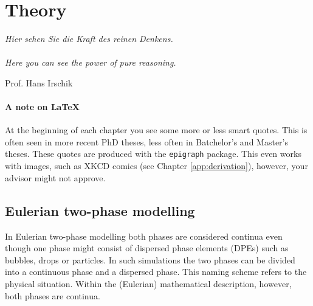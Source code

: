 \chapter{Theory}
\label{sec:theory}

\epigraph{
	\textit{Hier sehen Sie die Kraft des reinen Denkens.} \\
	\hspace{1ex}\\
	\textit{Here you can see the power of pure reasoning.}
}{Prof. Hans Irschik}
		



\subsubsection*{A note on \LaTeX{}}

At the beginning of each chapter you see some more or less smart quotes. This is often seen 
in more recent PhD theses, less often in Batchelor's and Master's theses. These quotes are 
produced with the \verb+epigraph+ package. This even works with images, such as XKCD comics 
(see Chapter \ref{app:derivation}), however, your advisor might not approve.



\section{Eulerian two-phase modelling}

In Eulerian two-phase modelling both phases are considered continua even though 
one phase might consist of dispersed phase elements (\acp{DPE}) such as bubbles, drops 
or particles. In such simulations the two phases can be divided into a 
continuous phase and a dispersed phase. This naming scheme refers to the physical 
situation. Within the (Eulerian) mathematical description, however, both phases 
are continua.


% 	  
% 	  




